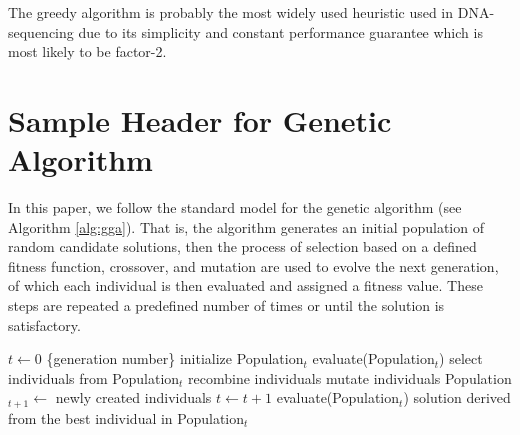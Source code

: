 The greedy algorithm is probably the most widely used
heuristic used in DNA-sequencing due to its simplicity and 
constant performance guarantee which is most likely to be factor-2.

\section{Sample Header for Genetic Algorithm}

In this paper, we follow the standard model for the genetic algorithm (see Algorithm \ref{alg:gga}).
That is, the algorithm generates an initial population of 
random candidate solutions, then 
the process of selection based on a defined fitness function,
crossover, and mutation are used to evolve the next generation, of which
each individual is then evaluated and
assigned a fitness value. These steps are repeated a
predefined number of times or until the solution is
satisfactory. 

\begin{algorithm}[H]
	\begin{algorithmic}[1]
	\STATE $t \leftarrow 0$ \{generation number\} 
	\STATE initialize Population$_{t}$ 
	\STATE evaluate(Population$_{t}$)
		\STATE select individuals from Population$_{t}$ 
		\STATE recombine individuals
		\STATE mutate individuals	
		\STATE Population$_{t+1} \leftarrow $ newly created individuals
		\STATE $t \leftarrow t + 1$
		\STATE evaluate(Population$_{t}$) 			
	\ENDWHILE
	\RETURN solution derived from the best individual in Population$_{t}$
	\end{algorithmic}
	\caption{GENERIC GA()}
	\label{alg:gga}
\end{algorithm}
